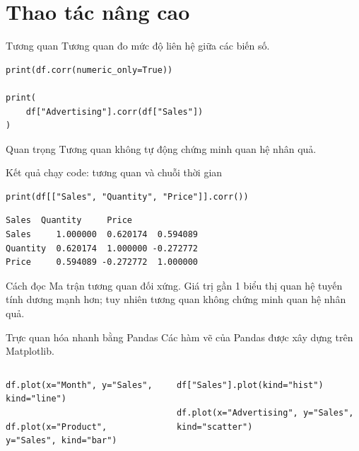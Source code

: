 \documentclass[aspectratio=169,11pt]{beamer}
\begin{document}
\section{Thao tác nâng cao}

\begin{frame}[fragile]{Tương quan}
\small
Tương quan đo mức độ liên hệ giữa các biến số.
\begin{lstlisting}[style=py]
print(df.corr(numeric_only=True))

print(
    df["Advertising"].corr(df["Sales"])
)
\end{lstlisting}
\begin{alertblock}{Quan trọng}
Tương quan không tự động chứng minh quan hệ nhân quả.
\end{alertblock}
\end{frame}

\begin{frame}[fragile]{Kết quả chạy code: tương quan và chuỗi thời gian}
\small
\begin{lstlisting}[style=py]
print(df[["Sales", "Quantity", "Price"]].corr())
\end{lstlisting}
\begin{lstlisting}[style=py]
             Sales  Quantity     Price
Sales     1.000000  0.620174  0.594089
Quantity  0.620174  1.000000 -0.272772
Price     0.594089 -0.272772  1.000000
\end{lstlisting}
\begin{block}{Cách đọc}
Ma trận tương quan đối xứng. Giá trị gần 1 biểu thị quan hệ tuyến tính dương mạnh hơn; tuy nhiên tương quan không chứng minh quan hệ nhân quả.
\end{block}
\end{frame}


\begin{frame}[fragile]{Trực quan hóa nhanh bằng Pandas}
\small
Các hàm vẽ của Pandas được xây dựng trên Matplotlib.
\begin{columns}[T]
\begin{lstlisting}[style=py]
df.plot(x="Month", y="Sales", kind="line")

df.plot(x="Product", y="Sales", kind="bar")
\end{lstlisting}
\begin{lstlisting}[style=py]
df["Sales"].plot(kind="hist")

df.plot(x="Advertising", y="Sales", kind="scatter")
\end{lstlisting}
\end{columns}
\end{frame}
\end{document}
